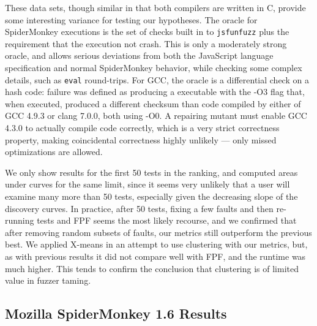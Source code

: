 These data sets, though similar in that both compilers are written in C, provide some interesting variance for testing our hypotheses.  The oracle for SpiderMonkey executions is the set of checks built in to {\tt jsfunfuzz} plus the requirement that the execution not crash.  This is only a moderately strong oracle, and allows serious deviations from both the JavaScript language specification and normal SpiderMonkey behavior, while checking some complex details, such as {\tt eval} round-trips.  For GCC, the oracle is a differential check on a hash code:  failure was defined as producing a executable with the -O3 flag that, when executed, produced a different checksum than code compiled by either of GCC 4.9.3 or clang 7.0.0, both using -O0.  A repairing mutant must enable GCC 4.3.0 to actually compile code correctly, which is a very strict correctness property, making coincidental correctness \cite{CCT} highly unlikely --- only missed optimizations are allowed.

We only show results for the first 50 tests in the ranking, and computed areas under curves for the same limit, since it seems very unlikely that a user will examine many more than 50 tests, especially given the decreasing slope of the discovery curves.  In practice, after 50 tests, fixing a few faults and then re-running tests and FPF seems the most likely recourse, and we confirmed that after removing random subsets of faults, our metrics still outperform the previous best.  We applied X-means \cite{xmeans} in an attempt to use clustering with our metrics, but, as with previous results \cite{PLDI13} it did not compare well with FPF, and the runtime was much higher.  This tends to confirm the conclusion \cite{PLDI13} that clustering is of limited value in fuzzer taming.

\subsection{Mozilla SpiderMonkey 1.6 Results}


